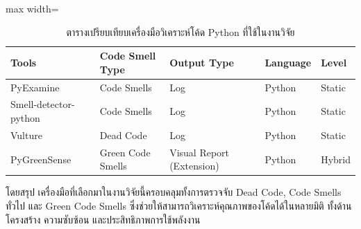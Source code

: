 \begin{table}[H]
    \centering
    \begin{adjustbox}{max width=\textwidth}
        \renewcommand{\arraystretch}{1.3}
        \setlength{\tabcolsep}{6pt}
        \begin{tabular}{|p{3.5cm}|p{3.5cm}|p{3cm}|p{3cm}|p{2cm}|}
            \hline
            {\boldfont Tools} & {\boldfont Code Smell Type} & {\boldfont Output Type} & {\boldfont Language} & {\boldfont Level}
            \\
            \hline
            PyExamine & Code Smells & Log & Python & Static
            \\
            \hline
            Smell-detector-python & Code Smells & Log & Python & Static
            \\
            \hline
            Vulture & Dead Code & Log & Python & Static
            \\
            \hline
            PyGreenSense & Green Code Smells & Visual Report (Extension) & Python & Hybrid
            \\
            \hline
        \end{tabular}
\end{adjustbox}
\captionsetup{justification=centering, name=ตาราง}
\caption{ตารางเปรียบเทียบเครื่องมือวิเคราะห์โค้ด Python ที่ใช้ในงานวิจัย}
\label{table:python-static-analysis-tools}
\end{table}

โดยสรุป เครื่องมือที่เลือกมาในงานวิจัยนี้ครอบคลุมทั้งการตรวจจับ {\italicfont Dead Code}, {\italicfont Code Smells} ทั่วไป และ {\italicfont Green Code Smells} ซึ่งช่วยให้สามารถวิเคราะห์คุณภาพของโค้ดได้ในหลายมิติ ทั้งด้านโครงสร้าง ความซับซ้อน และประสิทธิภาพการใช้พลังงาน